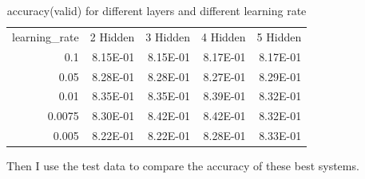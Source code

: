 \documentclass{article}
\begin{document}
\begin{table}[htbp]
  \centering
  \caption{accuracy(valid) for different layers and different learning rate}
    \begin{tabular}{|r|r|r|r|r|}
    \toprule
    \multicolumn{1}{|r|}{\multirow{2}[2]{*}{learning\_rate}} & \multicolumn{1}{r|}{\multirow{2}[2]{*}{2 Hidden}} & \multicolumn{1}{r|}{\multirow{2}[2]{*}{3 Hidden}} & \multicolumn{1}{r|}{\multirow{2}[2]{*}{4 Hidden}} & \multicolumn{1}{r|}{\multirow{2}[2]{*}{5 Hidden}} \\
          &       &       &       &  \\
    \midrule
    \multirow{2}[2]{*}{0.1} & \multirow{2}[2]{*}{8.15E-01} & \multirow{2}[2]{*}{8.15E-01} & \multirow{2}[2]{*}{8.17E-01} & \multirow{2}[2]{*}{8.17E-01} \\
          &       &       &       &  \\
    \midrule
    \multirow{2}[2]{*}{0.05} & \multirow{2}[2]{*}{8.28E-01} & \multirow{2}[2]{*}{8.28E-01} & \multirow{2}[2]{*}{8.27E-01} & \multirow{2}[2]{*}{8.29E-01} \\
          &       &       &       &  \\
    \midrule
    \multirow{2}[2]{*}{0.01} & \multirow{2}[2]{*}{8.35E-01} & \multirow{2}[2]{*}{8.35E-01} & \multirow{2}[2]{*}{8.39E-01} & \multirow{2}[2]{*}{8.32E-01} \\
          &       &       &       &  \\
    \midrule
    \multirow{2}[2]{*}{0.0075} & \multirow{2}[2]{*}{8.30E-01} & \multirow{2}[2]{*}{8.42E-01} & \multirow{2}[2]{*}{8.42E-01} & \multirow{2}[2]{*}{8.32E-01} \\
          &       &       &       &  \\
    \midrule
    \multirow{2}[2]{*}{0.005} & \multirow{2}[2]{*}{8.22E-01} & \multirow{2}[2]{*}{8.22E-01} & \multirow{2}[2]{*}{8.28E-01} & \multirow{2}[2]{*}{8.33E-01} \\
          &       &       &       &  \\
    \bottomrule
    \end{tabular}%
  \label{tab:addlabel}%
\end{table}%




Then I use the test data to compare the accuracy of these best systems.
\end{document}
